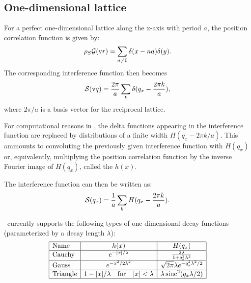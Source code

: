 \subsection{One-dimensional lattice} \label{sec:sect:1dlattice}
For a perfect one-dimensional lattice along the x-axis with period $a$, the position
correlation function is given by:
\begin{equation}
  \rho_S\mathcal{G}(\text{v}{r}) = \sum_{n\neq 0} \delta(x-na)\delta(y).
\end{equation}
The corresponding interference function then becomes
\begin{equation}
  \mathcal{S}(\text{v}{q}) = \frac{2\pi}{a}\sum_k \delta(q_x - \frac{2\pi k}{a}),
\end{equation}
where $2\pi /a$ is a basis vector for the reciprocal lattice.

For computational reasons in \BornAgain, the delta functions appearing in the interference function
are replaced by distributions of a finite width $H(q_x-2\pi k/a)$. This ammounts to convoluting the
previously given interference function with $H(q_x)$ or, equivalently, multiplying
the position correlation function by the inverse Fourier image of $H(q_x)$, called the
 $h(x)$.

The interference function can then be written as:
\begin{equation}
  \mathcal{S}(q_x) = \frac{1}{a}\sum_k H(q_x - \frac{2\pi k}{a}).
\end{equation}

\BornAgain\ currently supports the following types of one-dimensional decay functions
(parameterized by a decay length $\lambda$):
\begin{equation}
  \begin{array}{|l|c|c|}
    \hline
    \text{Name} & h(x) & H(q_x) \\
    \hline
    \text{Cauchy} & e^{-|x|/\lambda} & \frac{2\lambda}{1+q_x^2\lambda^2} \\
    \hline
    \text{Gauss} & e^{-x^2/2\lambda^2} & \sqrt{2\pi}\lambda e^{-q_x^2\lambda^2/2} \\
    \hline
    \text{Triangle} & 1-|x|/\lambda \quad \text{for} \quad |x|<\lambda & \lambda \operatorname{sinc}^2(q_x\lambda/2) \\
    \hline
  \end{array}
\end{equation}

